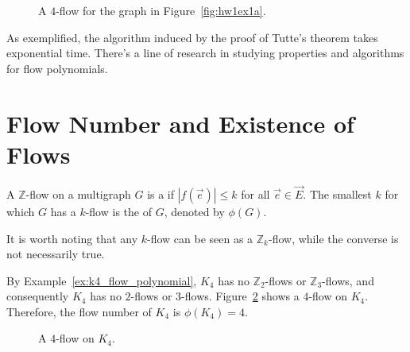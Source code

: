 \begin{figure}[htbp]
    \centering
    \caption{A \(4\)-flow for the graph in Figure~\ref{fig:hw1ex1a}.}
    \label{fig:hw1ex1a-4flow}
\end{figure}

As exemplified, the algorithm induced by the proof of Tutte's theorem takes exponential time.
There's a line of research in studying properties and algorithms for flow polynomials.

\section{Flow Number and Existence of Flows}

\begin{definition}
	A \(\mathbb{Z}\)-flow on a multigraph \(G\) is a  if \(|f(\vec{e})| \leq k\) for all \(\vec{e} \in \vec{E}\).
	The smallest \(k\) for which \(G\) has a \(k\)-flow is the  of \(G\), denoted by \(\phi(G)\).
\end{definition}

It is worth noting that any \(k\)-flow can be seen as a \(\mathbb{Z}_k\)-flow,
while the converse is not necessarily true.

\begin{example}
	By Example~\ref{ex:k4_flow_polynomial}, \(K_4\) has no \(\mathbb{Z}_2\)-flows or \(\mathbb{Z}_3\)-flows,
	and consequently \(K_4\) has no \(2\)-flows or \(3\)-flows.
	Figure~\ref{fig:k4_4_flow} shows a \(4\)-flow on \(K_4\).
	Therefore, the flow number of \(K_4\) is \(\phi(K_4) = 4\).
\end{example}

\begin{figure}[htbp]
	\centering
	\caption{A \(4\)-flow on \(K_4\).}
	\label{fig:k4_4_flow}
\end{figure}


